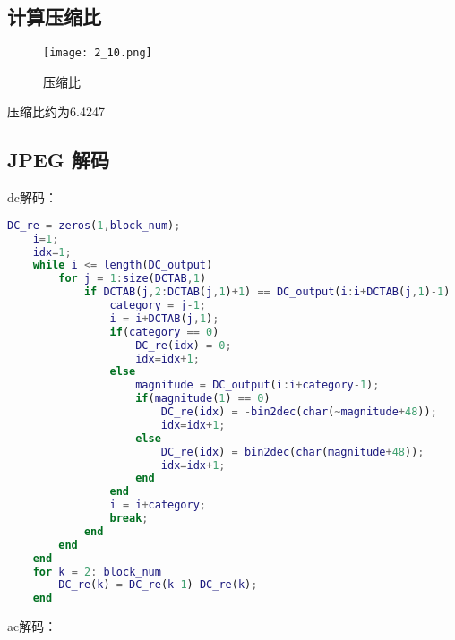 \documentclass[12pt]{article}
\begin{document}
\subsection{计算压缩比}

\begin{figure}[H]
    \centering
    \texttt{[image: 2\_10.png]}
    \caption{压缩比}
\end{figure}

压缩比约为6.4247

\subsection{JPEG 解码}

dc解码：
\begin{lstlisting}[language=matlab]
    DC_re = zeros(1,block_num);
    i=1;
    idx=1;
    while i <= length(DC_output)
        for j = 1:size(DCTAB,1)
            if DCTAB(j,2:DCTAB(j,1)+1) == DC_output(i:i+DCTAB(j,1)-1)
                category = j-1;
                i = i+DCTAB(j,1);
                if(category == 0)
                    DC_re(idx) = 0;
                    idx=idx+1;
                else
                    magnitude = DC_output(i:i+category-1);
                    if(magnitude(1) == 0)
                        DC_re(idx) = -bin2dec(char(~magnitude+48));
                        idx=idx+1;
                    else
                        DC_re(idx) = bin2dec(char(magnitude+48));
                        idx=idx+1;
                    end
                end
                i = i+category;
                break;
            end
        end
    end
    for k = 2: block_num
        DC_re(k) = DC_re(k-1)-DC_re(k);
    end
\end{lstlisting}

ac解码：
\end{document}
